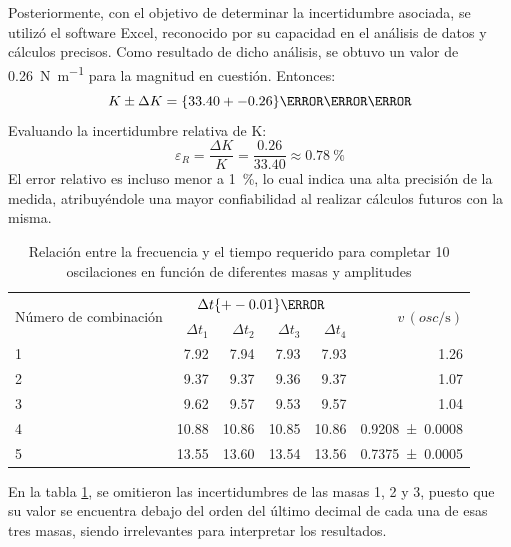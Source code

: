 \documentclass[../main.tex]{subfiles}
\begin{document}
Posteriormente, con el objetivo de determinar la incertidumbre asociada, se utilizó el software Excel, reconocido por su capacidad en el análisis de datos y cálculos precisos. Como resultado de dicho análisis, se obtuvo un valor de \qty{0.26}{\newton\per\metre} para la magnitud en cuestión. Entonces:
\begin{equation*}
  K \pm \Delta K = \qty{33.40 +- 0.26}{\newton\per\metre}
\end{equation*}
Evaluando la incertidumbre relativa de K:
\begin{equation*}
  \varepsilon_R = \frac{\Delta K}{K} = \frac{\num{0.26}}{\num{33.40}} \approx \qty{0.78}{\percent}
\end{equation*}
El error relativo es incluso menor a \qty{1}{\percent}, lo cual indica una alta precisión de la medida, atribuyéndole una mayor confiabilidad al realizar cálculos futuros con la misma.
\begin{table}[H]
  \caption{Relación entre la frecuencia y el tiempo requerido para completar 10 oscilaciones en función de diferentes masas y amplitudes}
  \label{tab:massAndFreq}
  \begin{center}
    \begin{tabular}[c]{lrrrrr}
      \toprule
      \multirow{2}{*}{Número de combinación} &
      \multicolumn{4}{c}{$\Delta t \qty{+- 0.01}{\second}$} &
      \multirow{2}{*}{$\mathit{v} \, (\unit{osc\per\second})$} \\
      \cmidrule{2-4}
      & $\Delta t_1$ & $\Delta t_2$ & $\Delta t_3$ & $\Delta t_4$ & \\
      \midrule
      1 & \num{7.92} & \num{7.94} & \num{7.93} & \num{7.93} & \num{1.26} \\
      2 & \num{9.37} & \num{9.37} & \num{9.36} & \num{9.37} & \num{1.07} \\
      3 & \num{9.62} & \num{9.57} & \num{9.53} & \num{9.57} & \num{1.04} \\
      4 & \num{10.88} & \num{10.86} & \num{10.85} & \num{10.86} & \num{0.9208 +- 0.0008} \\
      5 & \num{13.55} & \num{13.60} & \num{13.54} & \num{13.56} & \num{0.7375 +- 0.0005} \\
      \bottomrule
    \end{tabular}
  \end{center}
\end{table}
En la tabla \ref{tab:massAndFreq}, se omitieron las incertidumbres de las masas 1, 2 y 3, puesto que su valor se encuentra debajo del orden del último decimal de cada una de esas tres masas, siendo irrelevantes para interpretar los resultados.
\end{document}
